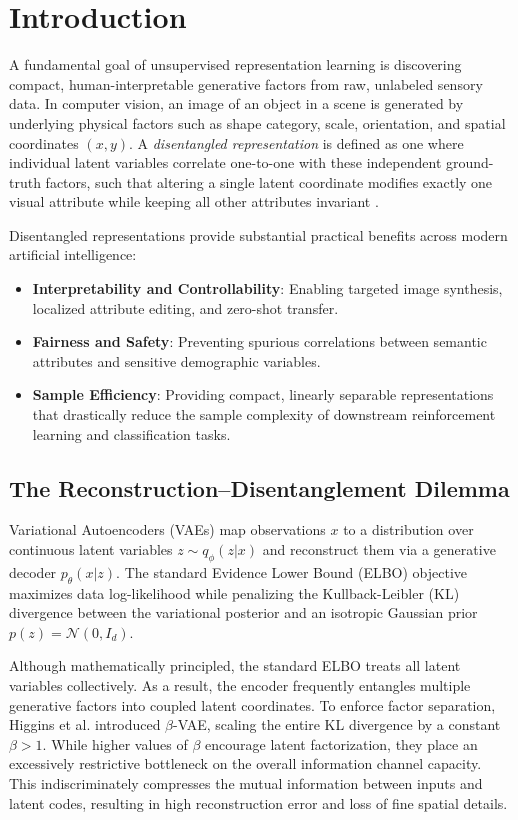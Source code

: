 \documentclass[11pt,a4paper]{article}
\begin{document}
\vspace{0.5em}

\section{Introduction}
A fundamental goal of unsupervised representation learning is discovering compact, human-interpretable generative factors from raw, unlabeled sensory data. In computer vision, an image of an object in a scene is generated by underlying physical factors such as shape category, scale, orientation, and spatial coordinates $(x, y)$. A \textit{disentangled representation} is defined as one where individual latent variables correlate one-to-one with these independent ground-truth factors, such that altering a single latent coordinate modifies exactly one visual attribute while keeping all other attributes invariant \cite{higgins2017beta, chen2018isolating, locatello2019challenging}.

Disentangled representations provide substantial practical benefits across modern artificial intelligence:
\begin{itemize}
    \item \textbf{Interpretability and Controllability}: Enabling targeted image synthesis, localized attribute editing, and zero-shot transfer.
    \item \textbf{Fairness and Safety}: Preventing spurious correlations between semantic attributes and sensitive demographic variables.
    \item \textbf{Sample Efficiency}: Providing compact, linearly separable representations that drastically reduce the sample complexity of downstream reinforcement learning and classification tasks.
\end{itemize}

\subsection{The Reconstruction--Disentanglement Dilemma}
Variational Autoencoders (VAEs) \cite{kingma2013auto} map observations $x$ to a distribution over continuous latent variables $z \sim q_\phi(z|x)$ and reconstruct them via a generative decoder $p_\theta(x|z)$. The standard Evidence Lower Bound (ELBO) objective maximizes data log-likelihood while penalizing the Kullback-Leibler (KL) divergence between the variational posterior and an isotropic Gaussian prior $p(z) = \mathcal{N}(0, I_d)$.

Although mathematically principled, the standard ELBO treats all latent variables collectively. As a result, the encoder frequently entangles multiple generative factors into coupled latent coordinates. To enforce factor separation, Higgins et al. \cite{higgins2017beta} introduced $\beta$-VAE, scaling the entire KL divergence by a constant $\beta > 1$. While higher values of $\beta$ encourage latent factorization, they place an excessively restrictive bottleneck on the overall information channel capacity. This indiscriminately compresses the mutual information between inputs and latent codes, resulting in high reconstruction error and loss of fine spatial details.
\end{document}
